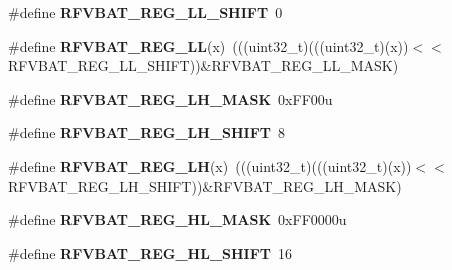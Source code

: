 \begin{DoxyCompactItemize}
\item 
\#define {\bfseries R\+F\+V\+B\+A\+T\+\_\+\+R\+E\+G\+\_\+\+L\+L\+\_\+\+S\+H\+I\+FT}~0\hypertarget{group__RFVBAT__Register__Masks_ga77fdef5edef0e9e20236761366ed3fbb}{}\label{group__RFVBAT__Register__Masks_ga77fdef5edef0e9e20236761366ed3fbb}

\item 
\#define {\bfseries R\+F\+V\+B\+A\+T\+\_\+\+R\+E\+G\+\_\+\+LL}(x)~(((uint32\+\_\+t)(((uint32\+\_\+t)(x))$<$$<$R\+F\+V\+B\+A\+T\+\_\+\+R\+E\+G\+\_\+\+L\+L\+\_\+\+S\+H\+I\+FT))\&R\+F\+V\+B\+A\+T\+\_\+\+R\+E\+G\+\_\+\+L\+L\+\_\+\+M\+A\+SK)\hypertarget{group__RFVBAT__Register__Masks_ga0e8446d5980a8863f4d5f0be690e78a3}{}\label{group__RFVBAT__Register__Masks_ga0e8446d5980a8863f4d5f0be690e78a3}

\item 
\#define {\bfseries R\+F\+V\+B\+A\+T\+\_\+\+R\+E\+G\+\_\+\+L\+H\+\_\+\+M\+A\+SK}~0x\+F\+F00u\hypertarget{group__RFVBAT__Register__Masks_gaac2f9a56be08c02d917e25d2160bb25d}{}\label{group__RFVBAT__Register__Masks_gaac2f9a56be08c02d917e25d2160bb25d}

\item 
\#define {\bfseries R\+F\+V\+B\+A\+T\+\_\+\+R\+E\+G\+\_\+\+L\+H\+\_\+\+S\+H\+I\+FT}~8\hypertarget{group__RFVBAT__Register__Masks_ga274af8b911ddd78c1ce6df899ad83cbd}{}\label{group__RFVBAT__Register__Masks_ga274af8b911ddd78c1ce6df899ad83cbd}

\item 
\#define {\bfseries R\+F\+V\+B\+A\+T\+\_\+\+R\+E\+G\+\_\+\+LH}(x)~(((uint32\+\_\+t)(((uint32\+\_\+t)(x))$<$$<$R\+F\+V\+B\+A\+T\+\_\+\+R\+E\+G\+\_\+\+L\+H\+\_\+\+S\+H\+I\+FT))\&R\+F\+V\+B\+A\+T\+\_\+\+R\+E\+G\+\_\+\+L\+H\+\_\+\+M\+A\+SK)\hypertarget{group__RFVBAT__Register__Masks_ga016bf338b7050742a030ffe81d9be9a4}{}\label{group__RFVBAT__Register__Masks_ga016bf338b7050742a030ffe81d9be9a4}

\item 
\#define {\bfseries R\+F\+V\+B\+A\+T\+\_\+\+R\+E\+G\+\_\+\+H\+L\+\_\+\+M\+A\+SK}~0x\+F\+F0000u\hypertarget{group__RFVBAT__Register__Masks_gae0f69a55f5feaf1e41b317aaa17780fe}{}\label{group__RFVBAT__Register__Masks_gae0f69a55f5feaf1e41b317aaa17780fe}

\item 
\#define {\bfseries R\+F\+V\+B\+A\+T\+\_\+\+R\+E\+G\+\_\+\+H\+L\+\_\+\+S\+H\+I\+FT}~16\hypertarget{group__RFVBAT__Register__Masks_ga069a18ff685d5c1e8e48acc77454bf70}{}\label{group__RFVBAT__Register__Masks_ga069a18ff685d5c1e8e48acc77454bf70}


\end{DoxyCompactItemize}
